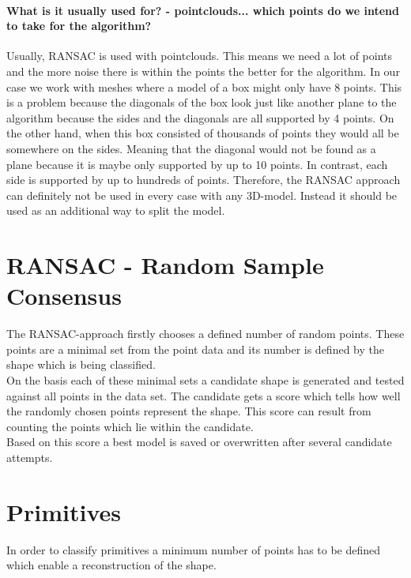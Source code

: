 \documentclass[../ClassicThesis.tex]{subfiles}
\begin{document}
\paragraph{What is it usually used for? - pointclouds... which points do we intend to take for the algorithm?}
Usually, RANSAC is used with pointclouds. This means we need a lot of points and the more noise there is within the points the better for the algorithm. In our case we work with meshes where a model of a box might only have 8 points. This is a problem because the diagonals of the box look just like another plane to the algorithm because the sides and the diagonals are all supported by 4 points. 
On the other hand, when this box consisted of thousands of points they would all be somewhere on the sides. Meaning that the diagonal would not be found as a plane because it is maybe only supported by up to 10 points. In contrast, each side is supported by up to hundreds of points. Therefore, the RANSAC approach can definitely not be used in every case with any 3D-model. Instead it should be used as an additional way to split the model.
\section{RANSAC - Random Sample Consensus}
The RANSAC-approach firstly chooses a defined number of random points. These points are a minimal set from the point data and its number is defined by the shape which is being classified.\\
On the basis each of these minimal sets a candidate shape is generated and tested against all points in the data set. The candidate gets a score which tells how well the randomly chosen points represent the shape. This score can result from counting the points which lie within the candidate.\\
Based on this score a best model is saved or overwritten after several candidate attempts.
\section{Primitives}
In order to classify primitives a minimum number of points has to be defined which enable a reconstruction of the shape.
\end{document}
